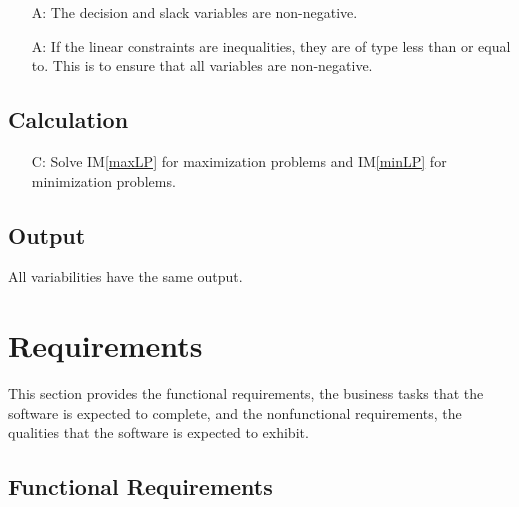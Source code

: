 \documentclass[12pt]{article}
\newcounter{assumpnum} %
\newcounter{calcnum} %
\newcommand{\iref}[1]{IM\ref{#1}}
\newcounter{lcnum} %
\begin{document}
\begin{itemize}
	\item[A\refstepcounter{assumpnum}\theassumpnum \label{A_nonnegative}:] The 
	 decision and slack variables are non-negative.
	
	\item[A\refstepcounter{assumpnum}\theassumpnum \label{A_inequalities}:] If 
	the linear constraints are inequalities, they are of type less than or 
	equal to. This is to ensure that all variables are non-negative.
\end{itemize}

\subsection{Calculation} \label{sec_Calculation}

\begin{itemize}
	\item[C\refstepcounter{calcnum}\thecalcnum \label{calculation}:] Solve 
	\iref{maxLP} for maximization problems and \iref{minLP} for minimization 
	problems.
\end{itemize}

\subsection{Output} \label{sec_Output}

All variabilities have the same output.    

\section{Requirements} \label{Sec_Requirements}

This section provides the functional requirements, the business tasks that the
software is expected to complete, and the nonfunctional requirements, the
qualities that the software is expected to exhibit.

\subsection{Functional Requirements}
\end{document}
